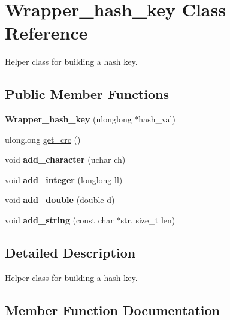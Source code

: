 \hypertarget{classWrapper__hash__key}{}\section{Wrapper\+\_\+hash\+\_\+key Class Reference}
\label{classWrapper__hash__key}


Helper class for building a hash key.  


\subsection*{Public Member Functions}
\begin{DoxyCompactItemize}
\item 
\mbox{\label{classWrapper__hash__key_a38a115c207664c051bff7885e1dd4b07}} 
{\bfseries Wrapper\+\_\+hash\+\_\+key} (ulonglong $\ast$hash\+\_\+val)
\item 
ulonglong \mbox{\hyperlink{classWrapper__hash__key_a573b326d48ba3678fdaad5aeea6ecc67}{get\+\_\+crc}} ()
\item 
\mbox{\label{classWrapper__hash__key_a78de5841ac7fee1fdad3376a9d7e6f57}} 
void {\bfseries add\+\_\+character} (uchar ch)
\item 
\mbox{\label{classWrapper__hash__key_a24b8832e96f43e7c5dad26e5dfab70a7}} 
void {\bfseries add\+\_\+integer} (longlong ll)
\item 
\mbox{\label{classWrapper__hash__key_a8927c933f5c594e48e66c092a8cc3bee}} 
void {\bfseries add\+\_\+double} (double d)
\item 
\mbox{\label{classWrapper__hash__key_abc8a88c0bdd024c85d89d38155fd4fcf}} 
void {\bfseries add\+\_\+string} (const char $\ast$str, size\+\_\+t len)
\end{DoxyCompactItemize}


\subsection{Detailed Description}
Helper class for building a hash key. 

\subsection{Member Function Documentation}
\mbox{\label{classWrapper__hash__key_a573b326d48ba3678fdaad5aeea6ecc67}} 
